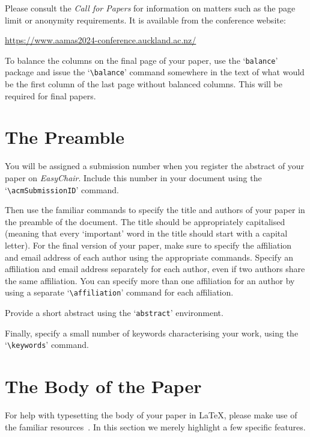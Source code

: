 \documentclass[sigconf]{aamas}
\begin{document}
Please consult the \emph{Call for Papers} for information on matters 
such as the page limit or anonymity requirements. It is available from
the conference website:
%
\begin{center}
\url{https://www.aamas2024-conference.auckland.ac.nz/}   
\end{center}
%
To balance the columns on the final page of your paper, use the 
`\texttt{balance}' package and issue the `\verb|\balance|' command
 somewhere in the text of what would be the first column of the last 
 page without balanced columns. This will be required for final papers.


\section{The Preamble}

You will be assigned a submission number when you register the abstract 
of your paper on \textit{EasyChair}. Include this number in your 
document using the `\verb|\acmSubmissionID|' command.

Then use the familiar commands to specify the title and authors of your
paper in the preamble of the document. The title should be appropriately 
capitalised (meaning that every `important' word in the title should 
start with a capital letter). For the final version of your paper, make 
sure to specify the affiliation and email address of each author using 
the appropriate commands. Specify an affiliation and email address 
separately for each author, even if two authors share the same 
affiliation. You can specify more than one affiliation for an author by 
using a separate `\verb|\affiliation|' command for each affiliation.

Provide a short abstract using the `\texttt{abstract}' environment.
 
Finally, specify a small number of keywords characterising your work, 
using the `\verb|\keywords|' command. 


\section{The Body of the Paper}

For help with typesetting the body of your paper in \LaTeX\@, please 
make use of the familiar resources~\cite{Lam94}. In this section we 
merely highlight a few specific features. 
\end{document}
